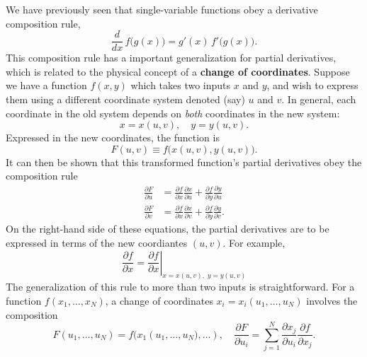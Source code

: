 \documentclass[10pt,a4paper]{article}
\begin{document}
We have previously seen that single-variable functions obey a derivative
composition rule,
\begin{equation}
\frac{d}{dx}\, f\big(g(x)\big) = g'(x) \, f'\big(g(x)\big).
\end{equation}
This composition rule has a important generalization for partial
derivatives, which is related to the physical concept of a
\textbf{change of coordinates}. Suppose we have a function $f(x,y)$
which takes two inputs $x$ and $y$, and wish to express them using a
different coordinate system denoted (say) $u$ and $v$. In general,
each coordinate in the old system depends on \textit{both} coordinates
in the new system:
\begin{equation}
x = x(u,v), \quad y = y(u,v).
\end{equation}
Expressed in the new coordinates, the function is
\begin{equation}
F(u,v) \equiv f\big(x(u,v), y(u,v)\big).
\end{equation}
It can then be shown that this transformed function's partial
derivatives obey the composition rule
\begin{equation}
\begin{aligned}\frac{\partial F}{\partial u} &= \frac{\partial f}{\partial x} \frac{\partial x}{\partial u} + \frac{\partial f}{\partial y} \frac{\partial y}{\partial u}\\ \frac{\partial F}{\partial v} &= \frac{\partial f}{\partial x} \frac{\partial x}{\partial v} + \frac{\partial f}{\partial y} \frac{\partial y}{\partial v}.\end{aligned}
\end{equation}
On the right-hand side of these equations, the partial derivatives are
to be expressed in terms of the new coordiantes $(u,v)$. For example,
\begin{equation}
\frac{\partial f}{\partial x} = \left.\frac{\partial f}{\partial x}\right|_{x = x(u,v), \;y= y(u,v)}
\end{equation}
The generalization of this rule to more than two inputs is
straightforward. For a function $f(x_1, \dots, x_N)$, a change of
coordinates $x_i = x_i(u_1, \dots, u_N)$ involves the composition
\begin{equation}
F(u_1, \dots, u_N) = f\big(x_1(u_1,\dots,u_N\big), \dots), \quad \frac{\partial F}{\partial u_i} = \sum_{j=1}^N \frac{\partial x_j}{\partial u_i} \frac{\partial f}{\partial x_j}.
\end{equation}
\end{document}
